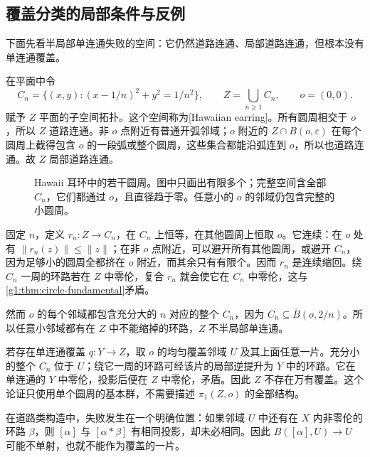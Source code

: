 \subsection{覆盖分类的局部条件与反例}
\label{g1:subsec:0504:05}

下面先看半局部单连通失败的空间：它仍然道路连通、局部道路连通，但根本没有单连通覆盖。

\begin{example}\label{g1:exm:hawaiian-earring}
	在平面中令
	\[
		C_n=\{(x,y):(x-1/n)^2+y^2=1/n^2\},\qquad
		Z=\bigcup_{n\ge1}C_n,\qquad o=(0,0).
	\]
	赋予 \(Z\) 平面的子空间拓扑。这个空间称为[Hawaiian earring]。所有圆周相交于 \(o\)，所以 \(Z\) 道路连通。非 \(o\) 点附近有普通开弧邻域；\(o\) 附近的 \(Z\cap B(o,\varepsilon)\) 在每个圆周上截得包含 \(o\) 的一段弧或整个圆周，这些集合都能沿弧连到 \(o\)，所以也道路连通。故 \(Z\) 局部道路连通。
	\begin{figure}[htbp]
		\centering
		
		\caption{Hawaii 耳环中的若干圆周。图中只画出有限多个；完整空间含全部 \(C_n\)，它们都通过 \(o\)，且直径趋于零。任意小的 \(o\) 的邻域仍包含完整的小圆周。}
		\label{g1:fig:hawaiian-earring}
	\end{figure}

	固定 \(n\)，定义 \(r_n:Z\to C_n\)，在 \(C_n\) 上恒等，在其他圆周上恒取 \(o\)。它连续：在 \(o\) 处有 \(\|r_n(z)\|\le\|z\|\)；在非 \(o\) 点附近，可以避开所有其他圆周，或避开 \(C_n\)，因为足够小的圆周全都挤在 \(o\) 附近，而其余只有有限个。因而 \(r_n\) 是连续缩回。绕 \(C_n\) 一周的环路若在 \(Z\) 中零伦，复合 \(r_n\) 就会使它在 \(C_n\) 中零伦，这与\cref{g1:thm:circle-fundamental}矛盾。

	然而 \(o\) 的每个邻域都包含充分大的 \(n\) 对应的整个 \(C_n\)，因为 \(C_n\subseteq\overline B(o,2/n)\)。所以任意小邻域都有在 \(Z\) 中不能缩掉的环路，\(Z\) 不半局部单连通。

	若存在单连通覆盖 \(q:Y\to Z\)，取 \(o\) 的均匀覆盖邻域 \(U\) 及其上面任意一片。充分小的整个 \(C_n\) 位于 \(U\)；绕它一周的环路可经该片的局部逆提升为 \(Y\) 中的环路。它在单连通的 \(Y\) 中零伦，投影后便在 \(Z\) 中零伦，矛盾。因此 \(Z\) 不存在万有覆盖。这个论证只使用单个圆周的基本群，不需要描述 \(\pi_1(Z,o)\) 的全部结构。
\end{example}

在道路类构造中，失败发生在一个明确位置：如果邻域 \(U\) 中还有在 \(X\) 内非零伦的环路 \(\beta\)，则 \([\alpha]\) 与 \([\alpha*\beta]\) 有相同投影，却未必相同。因此 \(B([\alpha],U)\to U\) 可能不单射，也就不能作为覆盖的一片。

